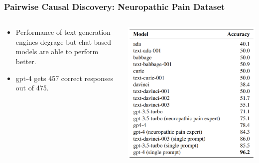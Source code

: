 \documentclass{beamer}
\begin{document}
\begin{frame}
	\frametitle{Pairwise Causal Discovery: Neuropathic Pain Dataset}
	\begin{columns}
		\begin{column}{0.5 \textwidth}
			\begin{itemize}
				\item Performance of text generation engines degrage but chat based models are able to perform better.
				\item gpt-4 gets 457 correct responses out of 475.
			\end{itemize}
		\end{column}
		\begin{column}{0.5 \textwidth}
			\includegraphics[scale=0.4]{imgs/table4.png}
		\end{column}
	\end{columns}
\end{frame}
\end{document}
